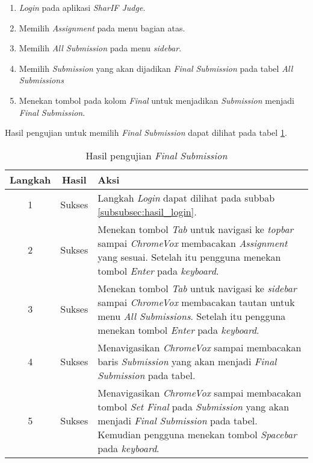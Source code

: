 \begin{enumerate}
	\item \textit{Login} pada aplikasi \textit{SharIF Judge}.
	\item Memilih \textit{Assignment} pada menu bagian atas.
	\item Memilih \textit{All Submission} pada menu \textit{sidebar}.
	\item Memilih \textit{Submission} yang akan dijadikan \textit{Final Submission} pada tabel \textit{All Submissions}
	\item Menekan tombol pada kolom \textit{Final} untuk menjadikan \textit{Submission} menjadi \textit{Final Submission}.
\end{enumerate}

Hasil pengujian untuk memilih \textit{Final Submission} dapat dilihat pada tabel \ref{tab:hasil_final_submission}.

\begin{table}[H]
	\centering
	\caption{Hasil pengujian \textit{Final Submission}}
	\label{tab:hasil_final_submission}
	\begin{tabular}{|c|c|p{12cm}|}
		\toprule
		Langkah & Hasil & Aksi\\
		\midrule
		1 & Sukses & Langkah \textit{Login} dapat dilihat pada subbab \ref{subsubsec:hasil_login}.\\
		2 & Sukses & Menekan tombol \textit{Tab} untuk navigasi ke \textit{topbar} sampai \textit{ChromeVox} membacakan \textit{Assignment} yang sesuai. Setelah itu pengguna menekan tombol \textit{Enter} pada \textit{keyboard}.\\
		3 & Sukses & Menekan tombol \textit{Tab} untuk navigasi ke \textit{sidebar} sampai \textit{ChromeVox} membacakan tautan untuk menu \textit{All Submissions}. Setelah itu pengguna menekan tombol \textit{Enter} pada \textit{keyboard}.\\
		4 & Sukses & Menavigasikan \textit{ChromeVox} sampai membacakan baris \textit{Submission} yang akan menjadi \textit{Final Submission} pada tabel.\\
		5 & Sukses & Menavigasikan \textit{ChromeVox} sampai membacakan tombol \textit{Set Final} pada \textit{Submission} yang akan menjadi \textit{Final Submission} pada tabel. Kemudian pengguna menekan tombol \textit{Spacebar} pada \textit{keyboard}.\\
		\bottomrule
	\end{tabular}
\end{table}